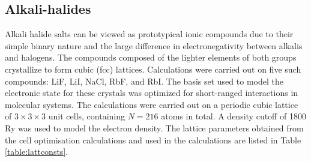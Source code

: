 \documentclass[aps,prb,twocolumn,amsmath,amssymb,superscriptaddress,longbibliography]{revtex4-1}
\begin{document}
 






\subsection*{Alkali-halides}


Alkali halide salts can be viewed as prototypical ionic compounds due to their simple binary nature and the large difference in electronegativity between alkalis and halogens. The compounds composed of the lighter elements of both groups crystallize to form cubic (fcc) lattices. 
Calculations were carried out on five such compounds: LiF, LiI, NaCl, RbF, and RbI. The basis set used to model the electronic state for these crystals was optimized for short-ranged interactions in molecular systems\cite{molopt}. The calculations were carried out on a periodic cubic lattice of $3 \times 3 \times 3$ unit cells, containing $N = 216$ atoms in total. A density cutoff of 1800 Ry was used to model the electron density.
The lattice parameters obtained from the cell optimisation calculations and used in the calculations are listed in Table \ref{table:lattconsts}.\\
\end{document}
